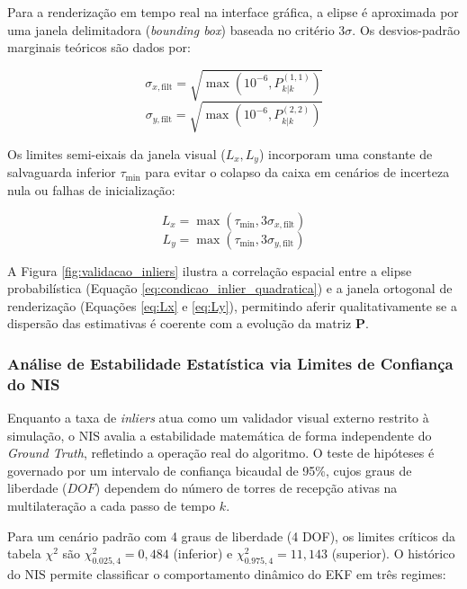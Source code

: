 Para a renderização em tempo real na interface gráfica, a elipse é aproximada por uma janela delimitadora (\textit{bounding box}) baseada no critério $3\sigma$. Os desvios-padrão marginais teóricos são dados por:

\begin{equation}
    \sigma_{x, \text{filt}} = \sqrt{\max(10^{-6}, P_{k|k}^{(1,1)})}
    \label{eq:sigma_x}
\end{equation}
\begin{equation}
    \sigma_{y, \text{filt}} = \sqrt{\max(10^{-6}, P_{k|k}^{(2,2)})}
    \label{eq:sigma_y}
\end{equation}

Os limites semi-eixais da janela visual ($L_x, L_y$) incorporam uma constante de salvaguarda inferior $\tau_{\min}$ para evitar o colapso da caixa em cenários de incerteza nula ou falhas de inicialização:

\begin{equation}
    L_x = \max(\tau_{\min}, 3\sigma_{x,\text{filt}})
    \label{eq:Lx}
\end{equation}
\begin{equation}
    L_y = \max(\tau_{\min}, 3\sigma_{y,\text{filt}})
    \label{eq:Ly}
\end{equation}

A Figura \ref{fig:validacao_inliers} ilustra a correlação espacial entre a elipse probabilística (Equação \ref{eq:condicao_inlier_quadratica}) e a janela ortogonal de renderização (Equações \ref{eq:Lx} e \ref{eq:Ly}), permitindo aferir qualitativamente se a dispersão das estimativas é coerente com a evolução da matriz $\mathbf{P}$.

\subsubsection{Análise de Estabilidade Estatística via Limites de Confiança do NIS}
\label{subsubsec:limites_nis}

Enquanto a taxa de \textit{inliers} atua como um validador visual externo restrito à simulação, o $\text{NIS}$ avalia a estabilidade matemática de forma independente do \textit{Ground Truth}, refletindo a operação real do algoritmo. O teste de hipóteses é governado por um intervalo de confiança bicaudal de 95\%, cujos graus de liberdade ($DOF$) dependem do número de torres de recepção ativas na multilateração a cada passo de tempo $k$.

Para um cenário padrão com 4 graus de liberdade (4 DOF), os limites críticos da tabela $\chi^2$ são $\chi^2_{0.025, 4} = 0{,}484$ (inferior) e $\chi^2_{0.975, 4} = 11{,}143$ (superior). O histórico do $\text{NIS}$ permite classificar o comportamento dinâmico do EKF em três regimes:

